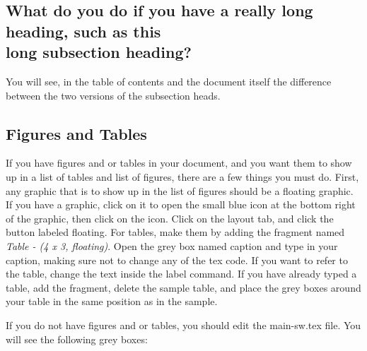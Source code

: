 \subsection{What do you do if you have a really long heading, such as this%
\vspace{-\singlespace} \\ 
long subsection heading?}

You will see, in the table of contents and the document itself the
difference between the two versions of the subsection heads.

\subsection{Figures and Tables}

If you have figures and or tables in your document, and you want them to
show up in a list of tables and list of figures, there are a few things you
must do. First, any graphic that is to show up in the list of figures should
be a floating graphic. If you have a graphic, click on it to open the small
blue icon at the bottom right of the graphic, then click on the icon. Click
on the layout tab, and click the button labeled floating. For tables, make
them by adding the fragment named \emph{Table - (4 x 3, floating)}. Open the
grey box named caption and type in your caption, making sure not to change
any of the tex code. If you want to refer to the table, change the text
inside the \TEXTsymbol{\backslash}label command. If you have already typed a
table, add the fragment, delete the sample table, and place the grey boxes
around your table in the same position as in the sample.

If you do not have figures and or tables, you should edit the main-sw.tex
file. You will see the following grey boxes:

\begin{center}

%
\end{center}

